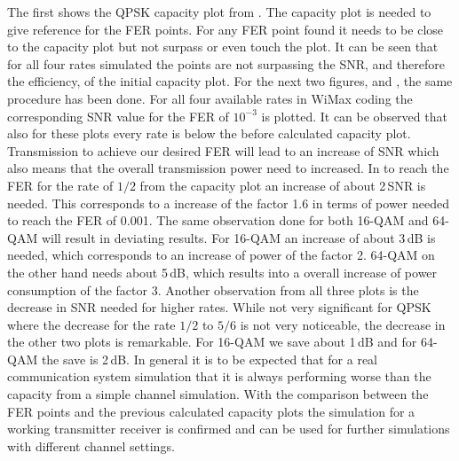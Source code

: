 \newpage
The first  shows the QPSK capacity plot from . The capacity plot is needed to give reference for the \gls{FER} points. For any \gls{FER} point found it needs to be close to the capacity plot but not surpass or even touch the plot. It can be seen that for all four rates simulated the points are not surpassing the \gls{SNR}, and therefore the efficiency, of the initial  capacity plot.
\newline
For the next two figures,  and , the same procedure has been done. For all four available rates in WiMax coding the corresponding SNR value for the \gls{FER} of $10^{-3}$ is plotted. It can be observed that also for these plots every rate is below the before calculated capacity plot. Transmission to achieve our desired \gls{FER} will lead to an increase of \gls{SNR} which also means that the overall transmission power need to increased. In  to reach the \gls{FER} for the rate of $1/2$ from the capacity plot an increase of about 2\,\gls{SNR} is needed. This corresponds to a increase of the factor 1.6 in terms of power needed to reach the \gls{FER} of 0.001. The same observation done for both 16-QAM and 64-QAM will result in deviating results. For 16-QAM an increase of about 3\,dB is needed, which corresponds to an increase of power of the factor 2. 64-QAM on the other hand needs about 5\,dB, which results into a overall increase of power consumption of the factor 3.
\newline
Another observation from all three plots is the decrease in \gls{SNR} needed for higher rates. While not very significant for \gls{QPSK} where the decrease for the rate $1/2$ to $5/6$ is not very noticeable, the decrease in the other two plots is remarkable. For 16-QAM we save about 1\,dB and for 64-QAM the save is 2\,dB.
In general it is to be expected that for a real communication system simulation that it is always performing worse than the capacity from a simple channel simulation. With the comparison between the \gls{FER} points and the previous calculated capacity plots the simulation for a working transmitter receiver is confirmed and can be used for further simulations with different channel settings.




